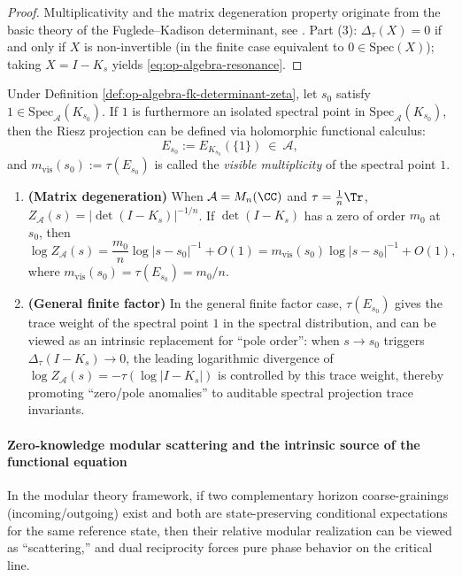 \begin{proof}
Multiplicativity and the matrix degeneration property originate from the basic theory of the Fuglede--Kadison determinant, see \cite{FugledeKadison1951DeterminantsTraceFiniteFactors}.
Part (3): \(\Delta_\tau(X)=0\) if and only if \(X\) is non-invertible (in the finite case equivalent to \(0\in\mathrm{Spec}(X)\));
taking \(X=I-K_s\) yields \eqref{eq:op-algebra-resonance}. \qedhere
\end{proof}

\begin{remark}\label{rem:op-algebra-nc-zeta-visible-multiplicity}
Under Definition \ref{def:op-algebra-fk-determinant-zeta}, let \(s_0\) satisfy \(1\in\mathrm{Spec}_{\mathcal{A}}(K_{s_0})\).
If \(1\) is furthermore an isolated spectral point in \(\mathrm{Spec}_{\mathcal{A}}(K_{s_0})\), then the Riesz projection can be defined via holomorphic functional calculus:
\[
E_{s_0}:=E_{K_{s_0}}(\{1\})\ \in\ \mathcal{A},
\]
and
\(
m_{\mathrm{vis}}(s_0):=\tau(E_{s_0})
\)
is called the \emph{visible multiplicity} of the spectral point \(1\).
\begin{enumerate}
  \item \textbf{(Matrix degeneration)} When \(\mathcal{A}=M_n(\CC)\) and \(\tau=\frac{1}{n}\Tr\),
  \(Z_{\mathcal{A}}(s)=|\det(I-K_s)|^{-1/n}\).
  If \(\det(I-K_s)\) has a zero of order \(m_0\) at \(s_0\), then
  \[
  \log Z_{\mathcal{A}}(s)
  =\frac{m_0}{n}\log|s-s_0|^{-1}+O(1)
  =m_{\mathrm{vis}}(s_0)\log|s-s_0|^{-1}+O(1),
  \]
  where \(m_{\mathrm{vis}}(s_0)=\tau(E_{s_0})=m_0/n\).
  \item \textbf{(General finite factor)} In the general finite factor case, \(\tau(E_{s_0})\) gives the trace weight of the spectral point \(1\) in the spectral distribution,
  and can be viewed as an intrinsic replacement for ``pole order'': when \(s\to s_0\) triggers \(\Delta_\tau(I-K_s)\to 0\),
  the leading logarithmic divergence of \(\log Z_{\mathcal{A}}(s)=-\tau(\log|I-K_s|)\) is controlled by this trace weight,
  thereby promoting ``zero/pole anomalies'' to auditable spectral projection trace invariants.
\end{enumerate}
\end{remark}

\paragraph{Zero-knowledge modular scattering and the intrinsic source of the functional equation}
In the modular theory framework, if two complementary horizon coarse-grainings (incoming/outgoing) exist and both are state-preserving conditional expectations for the same reference state,
then their relative modular realization can be viewed as ``scattering,'' and dual reciprocity forces pure phase behavior on the critical line.

